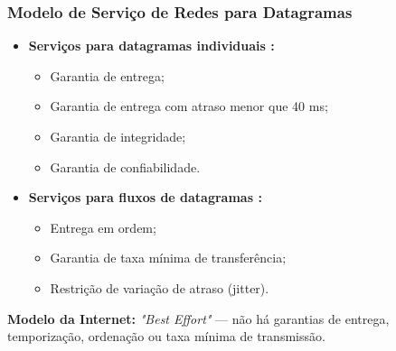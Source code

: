        \subsubsection*{Modelo de Serviço de Redes para Datagramas}
            \begin{itemize}[left=0.5cm, align=left, nosep]
                \item \textbf{Serviços para datagramas individuais :}
                    \begin{itemize}[left=0.5cm, nosep, label=$\hookrightarrow$]
                        \item Garantia de entrega; 
                        \item Garantia de entrega com atraso menor que 40 ms; 
                        \item Garantia de integridade; 
                        \item Garantia de confiabilidade.
                    \end{itemize} 
                     
                \item \textbf{Serviços para fluxos de datagramas :}
                    \begin{itemize}[left=0.5cm, nosep, label=$\hookrightarrow$]
                        \item Entrega em ordem;
                        \item Garantia de taxa mínima de transferência; 
                        \item Restrição de variação de atraso (jitter).
                    \end{itemize} 
                     
            \end{itemize}

        \textbf{Modelo da Internet:} \textit{"Best Effort"} — não há garantias de entrega, temporização, ordenação ou taxa mínima de transmissão.

